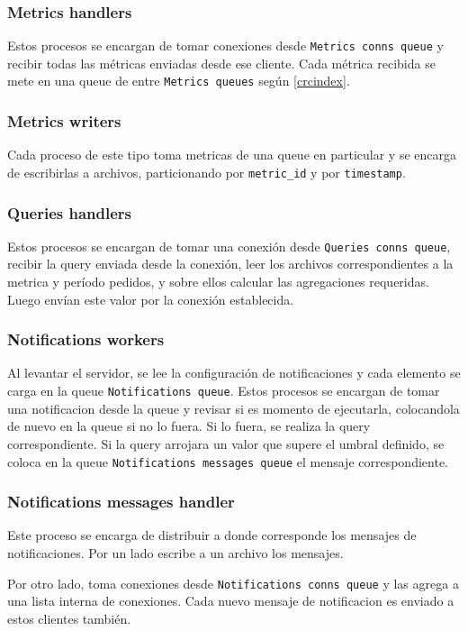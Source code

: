 \documentclass[a4paper,oneside]{article}
\begin{document}
\subsubsection{Metrics handlers}
Estos procesos se encargan de tomar conexiones desde \texttt{Metrics conns queue} y recibir todas las métricas enviadas desde ese cliente. Cada métrica recibida se mete en una queue de entre \texttt{Metrics queues} según \eqref{crcindex}.

\subsubsection{Metrics writers}
Cada proceso de este tipo toma metricas de una queue en particular y se encarga de escribirlas a archivos, particionando por \texttt{metric\_id} y por \texttt{timestamp}.

\subsubsection{Queries handlers}
Estos procesos se encargan de tomar una conexión desde \texttt{Queries conns queue}, recibir la query enviada desde la conexión, leer los archivos correspondientes a la metrica y período pedidos, y sobre ellos calcular las agregaciones requeridas. Luego envían este valor por la conexión establecida.

\subsubsection{Notifications workers}
Al levantar el servidor, se lee la configuración de notificaciones y cada elemento se carga en la queue \texttt{Notifications queue}. Estos procesos se encargan de tomar una notificacion desde la queue y revisar si es momento de ejecutarla, colocandola de nuevo en la queue si no lo fuera. Si lo fuera, se realiza la query correspondiente. Si la query arrojara un valor que supere el umbral definido, se coloca en la queue \texttt{Notifications messages queue} el mensaje correspondiente.

\subsubsection{Notifications messages handler}
Este proceso se encarga de distribuir a donde corresponde los mensajes de notificaciones. Por un lado escribe a un archivo los mensajes.

Por otro lado, toma conexiones desde \texttt{Notifications conns queue} y las agrega a una lista interna de conexiones. Cada nuevo mensaje de notificacion es enviado a estos clientes también.
\end{document}
